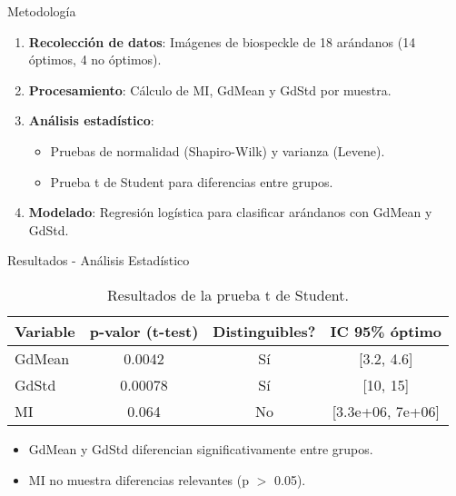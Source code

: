 \documentclass{beamer}
\begin{document}
\begin{frame}{Metodología}
    \begin{enumerate}
        \item \textbf{Recolección de datos}: Imágenes de biospeckle de 18 arándanos (14 óptimos, 4 no óptimos).
        \item \textbf{Procesamiento}: Cálculo de MI, GdMean y GdStd por muestra.
        \item \textbf{Análisis estadístico}: 
        \begin{itemize}
            \item Pruebas de normalidad (Shapiro-Wilk) y varianza (Levene).
            \item Prueba t de Student para diferencias entre grupos.
        \end{itemize}
        \item \textbf{Modelado}: Regresión logística para clasificar arándanos con GdMean y GdStd.
    \end{enumerate}
\end{frame}

\begin{frame}{Resultados - Análisis Estadístico}
    \begin{table}
        \centering
        \begin{tabular}{|l|c|c|c|}
            \hline
            \textbf{Variable} & \textbf{p-valor (t-test)} & \textbf{Distinguibles?} & \textbf{IC 95\% óptimo} \\
            \hline
            GdMean & 0.0042 & Sí & [3.2, 4.6] \\
            GdStd & 0.00078 & Sí & [10, 15] \\
            MI & 0.064 & No & [3.3e+06, 7e+06] \\
            \hline
        \end{tabular}
        \caption{Resultados de la prueba t de Student.}
    \end{table}
    \begin{itemize}
        \item GdMean y GdStd diferencian significativamente entre grupos.
        \item MI no muestra diferencias relevantes (p $>$ 0.05).
    \end{itemize}
\end{frame}
\end{document}
